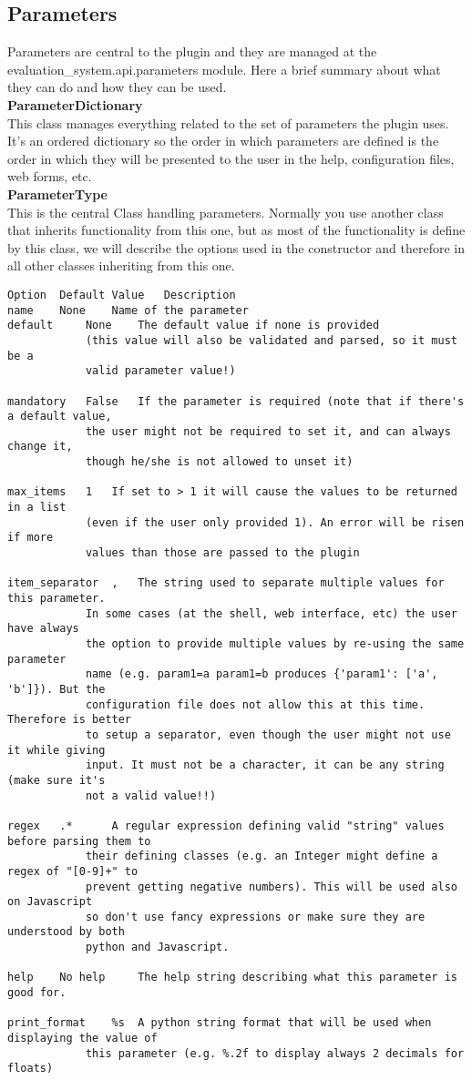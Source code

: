 \documentclass[a4paper,11pt]{ltxdoc}
\begin{document}
\subsection{Parameters}
Parameters are central to the plugin and they are managed at the evaluation\_system.api.parameters module. Here a brief summary about what they can do and how they can be used.
\\
\textbf{ParameterDictionary}\\
This class manages everything related to the set of parameters the plugin uses. It's an ordered dictionary so the order in which parameters are defined is the order in which they will be presented to the user in the help, configuration files, web forms, etc.\\
\textbf{ParameterType}\\
This is the central Class handling parameters. Normally you use another class that inherits functionality from this one, but as most of the functionality is define by this class, we will describe the options used in the constructor and therefore in all other classes inheriting from this one.\\
\begin{lstlisting}
Option 	Default Value 	Description
name 	None 	Name of the parameter
default 	None 	The default value if none is provided 
			(this value will also be validated and parsed, so it must be a 
			valid parameter value!)

mandatory 	False 	If the parameter is required (note that if there's a default value, 
			the user might not be required to set it, and can always change it, 
			though he/she is not allowed to unset it)

max_items 	1 	If set to > 1 it will cause the values to be returned in a list 
			(even if the user only provided 1). An error will be risen if more 
			values than those are passed to the plugin

item_separator 	, 	The string used to separate multiple values for this parameter. 
			In some cases (at the shell, web interface, etc) the user have always 
			the option to provide multiple values by re-using the same parameter 
			name (e.g. param1=a param1=b produces {'param1': ['a', 'b']}). But the 
			configuration file does not allow this at this time. Therefore is better 
			to setup a separator, even though the user might not use it while giving 
			input. It must not be a character, it can be any string (make sure it's 
			not a valid value!!)

regex 	.* 		A regular expression defining valid "string" values before parsing them to 
			their defining classes (e.g. an Integer might define a regex of "[0-9]+" to 
			prevent getting negative numbers). This will be used also on Javascript 
			so don't use fancy expressions or make sure they are understood by both 
			python and Javascript.

help 	No help 	The help string describing what this parameter is good for.

print_format 	%s 	A python string format that will be used when displaying the value of 
			this parameter (e.g. %.2f to display always 2 decimals for floats)
\end{lstlisting}
\end{document}
